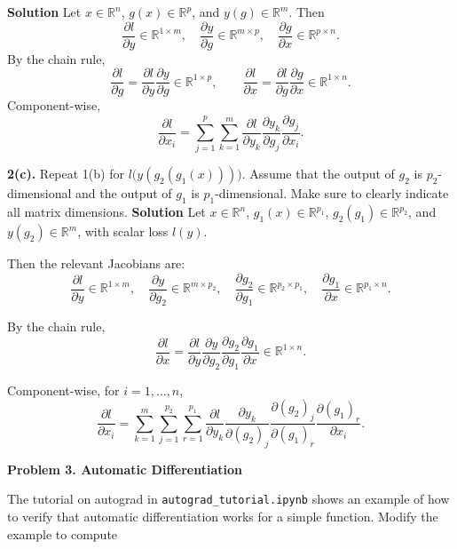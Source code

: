 \documentclass[11pt]{article}
\begin{document}
	\noindent\textbf{Solution}
	Let $x \in \mathbb{R}^n$, $g(x) \in \mathbb{R}^p$, and $y(g) \in \mathbb{R}^m$.
	Then
	\[
	\frac{\partial l}{\partial y} \in \mathbb{R}^{1 \times m}, \quad
	\frac{\partial y}{\partial g} \in \mathbb{R}^{m \times p}, \quad
	\frac{\partial g}{\partial x} \in \mathbb{R}^{p \times n}.
	\]
	By the chain rule,
	\[
	\frac{\partial l}{\partial g}
	= \frac{\partial l}{\partial y} \frac{\partial y}{\partial g}
	\in \mathbb{R}^{1 \times p},
	\qquad
	\frac{\partial l}{\partial x}
	= \frac{\partial l}{\partial g} \frac{\partial g}{\partial x}
	\in \mathbb{R}^{1 \times n}.
	\]
	Component-wise,
	\[
	\frac{\partial l}{\partial x_i}
	= \sum_{j=1}^{p} \sum_{k=1}^{m}
	\frac{\partial l}{\partial y_k}
	\frac{\partial y_k}{\partial g_j}
	\frac{\partial g_j}{\partial x_i}.
	\]
	
	\noindent\textbf{2(c).} Repeat 1(b) for \(l\big(y(g_{2}(g_{1}(x)))\big)\). Assume that the
	output of \(g_{2}\) is \(p_{2}\)-dimensional and the output of \(g_{1}\) is \(p_{1}\)-dimensional.
	Make sure to clearly indicate all matrix dimensions.
	\noindent\textbf{Solution}
	Let $x \in \mathbb{R}^n$, $g_{1}(x) \in \mathbb{R}^{p_{1}}$, $g_{2}(g_{1}) \in \mathbb{R}^{p_{2}}$,
	and $y(g_{2}) \in \mathbb{R}^m$, with scalar loss $l(y)$.
	
	Then the relevant Jacobians are:
	\[
	\frac{\partial l}{\partial y} \in \mathbb{R}^{1 \times m}, \quad
	\frac{\partial y}{\partial g_{2}} \in \mathbb{R}^{m \times p_{2}}, \quad
	\frac{\partial g_{2}}{\partial g_{1}} \in \mathbb{R}^{p_{2} \times p_{1}}, \quad
	\frac{\partial g_{1}}{\partial x} \in \mathbb{R}^{p_{1} \times n}.
	\]
	
	By the chain rule,
	\[
	\frac{\partial l}{\partial x}
	= \frac{\partial l}{\partial y}
	\frac{\partial y}{\partial g_{2}}
	\frac{\partial g_{2}}{\partial g_{1}}
	\frac{\partial g_{1}}{\partial x}
	\in \mathbb{R}^{1 \times n}.
	\]
	
	Component-wise, for $i = 1,\dots,n$,
	\[
	\frac{\partial l}{\partial x_i}
	= \sum_{k=1}^{m} \sum_{j=1}^{p_{2}} \sum_{r=1}^{p_{1}}
	\frac{\partial l}{\partial y_k}
	\frac{\partial y_k}{\partial (g_{2})_j}
	\frac{\partial (g_{2})_j}{\partial (g_{1})_r}
	\frac{\partial (g_{1})_r}{\partial x_i}.
	\]
	\newpage
	
	\vspace{0.5em}
	\noindent\textbf{Problem 3. Automatic Differentiation}
	
	The tutorial on autograd in \texttt{autograd\_tutorial.ipynb} shows an example of how to
	verify that automatic differentiation works for a simple function. Modify the
	example to compute
	
\end{document}
